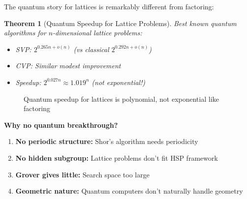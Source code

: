 \documentclass[11pt,a4paper]{article}
\newtheorem{theorem}{Theorem}
\begin{document}
The quantum story for lattices is remarkably different from factoring:

\begin{theorem}[Quantum Speedup for Lattice Problems]
Best known quantum algorithms for $n$-dimensional lattice problems:
\begin{itemize}
    \item SVP: $2^{0.265n + o(n)}$ (vs classical $2^{0.292n + o(n)}$)
    \item CVP: Similar modest improvement
    \item Speedup: $2^{0.027n} \approx 1.019^n$ (not exponential!)
\end{itemize}
\end{theorem}

\begin{figure}[h]
\centering
{}
\caption{Quantum speedup for lattices is polynomial, not exponential like factoring}
\end{figure}

\textbf{Why no quantum breakthrough?}
\begin{enumerate}
    \item \textbf{No periodic structure:} Shor's algorithm needs periodicity
    \item \textbf{No hidden subgroup:} Lattice problems don't fit HSP framework
    \item \textbf{Grover gives little:} Search space too large
    \item \textbf{Geometric nature:} Quantum computers don't naturally handle geometry
\end{enumerate}
\end{document}
